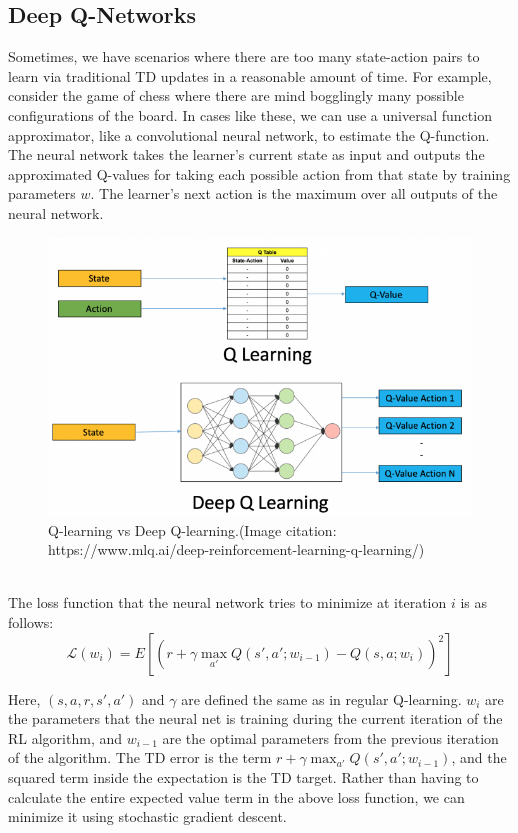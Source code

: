 \subsection{Deep Q-Networks}
Sometimes, we have scenarios where there are too many state-action pairs to learn via traditional TD updates in a reasonable amount of time. For example, consider the game of chess where there are mind bogglingly many possible configurations of the board. In cases like these, we can use a universal function approximator, like a convolutional neural network, to estimate the Q-function. The neural network takes the learner's current state as input and outputs the approximated Q-values for taking each possible action from that state by training parameters $w$. The learner's next action is the maximum over all outputs of the neural network.
\begin{figure}[ht!]
    \centering
    \includegraphics[scale=0.6]{../ReinforcementLearning/fig/deep-q-learning.png}
    \caption{Q-learning vs Deep Q-learning.(Image citation: https://www.mlq.ai/deep-reinforcement-learning-q-learning/)}
\end{figure}\\
The loss function that the neural network tries to minimize at iteration $i$ is as follows:
\begin{equation}
    \mathcal{L}(w_i) = E[(r + \gamma\max_{a'}Q(s', a'; w_{i-1}) - Q(s, a; w_i))^2]
\end{equation}

Here, $(s, a, r, s', a')$ and $\gamma$ are defined the same as in regular Q-learning. $w_i$ are the parameters that the neural net is training during the current iteration of the RL algorithm, and $w_{i-1}$ are the optimal parameters from the previous iteration of the algorithm. The TD error is the term $r + \gamma\max_{a'}Q(s', a';w_{i-1})$, and the squared term inside the expectation is the TD target. Rather than having to calculate the entire expected value term in the above loss function, we can minimize it using stochastic gradient descent.\\

